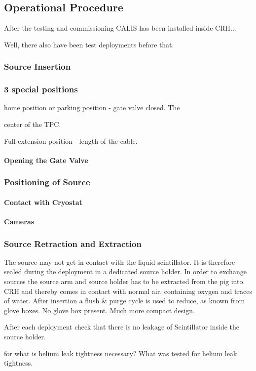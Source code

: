 
\subsection{Operational Procedure}
After the testing and commissioning CALIS has been installed inside CRH... 

Well, there also have been test deployments before that.
\subsubsection{Source Insertion}

\subsubsection{3 special positions}
home position or parking position - gate valve closed. The 

center of the TPC.

Full extension position - length of the cable.






\paragraph{Opening the Gate Valve}
\subsubsection{Positioning of Source}
\paragraph{Contact with Cryostat}
\paragraph{Cameras}
\subsubsection{Source Retraction and Extraction}
The source may not get in contact with the liquid scintillator. It is therefore sealed during the deployment in a dedicated source holder. In order to exchange sources the source arm and source holder has to be extracted from the pig into CRH and thereby comes in contact with normal air, containing oxygen and traces of water. After insertion a flush \& purge cycle is used to reduce, as known from glove boxes. No glove box present. Much more compact design.

After each deployment check that there is no leakage of Scintillator inside the source holder.



for what is helium leak tightness necessary? What was tested for helium leak tightness.




